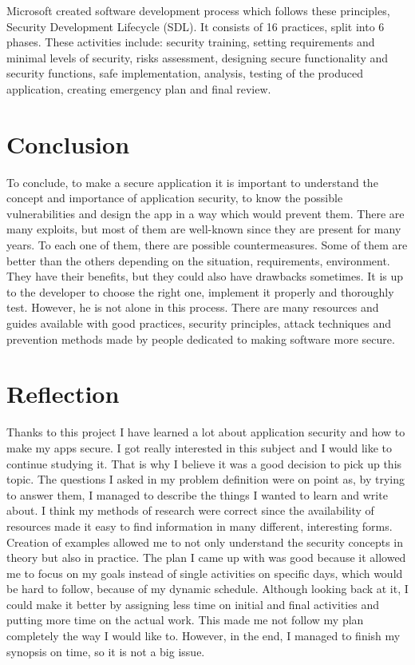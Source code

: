 \documentclass[a4paper]{article}
\begin{document}
Microsoft created software development process which follows these principles,
Security Development Lifecycle (SDL). It consists of 16 practices, split into 6
phases. These activities include: security training, setting requirements and
minimal levels of security, risks assessment, designing secure functionality and
security functions, safe implementation, analysis, testing of the produced
application, creating emergency plan and final review.

\newpage

\section{Conclusion}

To conclude, to make a secure application it is important to understand the
concept and importance of application security, to know the possible
vulnerabilities and design the app in a way which would prevent them. There are
many exploits, but most of them are well-known since they are present for many
years. To each one of them, there are possible countermeasures. Some of them are
better than the others depending on the situation, requirements, environment.
They have their benefits, but they could also have drawbacks sometimes. It is up
to the developer to choose the right one, implement it properly and thoroughly
test. However, he is not alone in this process. There are many resources and
guides available with good practices, security principles, attack techniques and
prevention methods made by people dedicated to making software more secure.

\section{Reflection}

Thanks to this project I have learned a lot about application security and how
to make my apps secure. I got really interested in this subject and I would
like to continue studying it. That is why I believe it was a good decision to
pick up this topic. The questions I asked in my problem definition were on
point as, by trying to answer them, I managed to describe the things I wanted
to learn and write about. I think my methods of research were correct since the
availability of resources made it easy to find information in many different,
interesting forms. Creation of examples allowed me to not only understand the
security concepts in theory but also in practice. The plan I came up with was
good because it allowed me to focus on my goals instead of single activities on
specific days, which would be hard to follow, because of my dynamic schedule.
Although looking back at it, I could make it better by assigning less time on
initial and final activities and putting more time on the actual work. This
made me not follow my plan completely the way I would like to. However, in the
end, I managed to finish my synopsis on time, so it is not a big issue.
\end{document}
